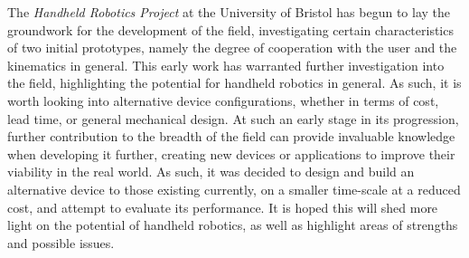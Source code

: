 \documentclass[11pt]{article}
\begin{document}
The \textit{Handheld Robotics Project} at the University of Bristol has begun to lay the groundwork for the development of the field, investigating certain characteristics of two initial prototypes, namely the degree of cooperation with the user and the kinematics in general. This early work has warranted further investigation into the field, highlighting the potential for handheld robotics in general. As such, it is worth looking into alternative device configurations, whether in terms of cost, lead time, or general mechanical design. At such an early stage in its progression, further contribution to the breadth of the field can provide invaluable knowledge when developing it further, creating new devices or applications to improve their viability in the real world. As such, it was decided to design and build an alternative device to those existing currently, on a smaller time-scale at a reduced cost, and attempt to evaluate its performance. It is hoped this will shed more light on the potential of handheld robotics, as well as highlight areas of strengths and possible issues.
\end{document}
